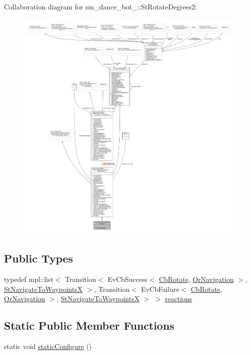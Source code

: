 Collaboration diagram for sm\+\_\+dance\+\_\+bot\+\_\+:\+:St\+Rotate\+Degrees2\+:
\nopagebreak
\begin{figure}[H]
\begin{center}
\leavevmode
\includegraphics[width=350pt]{structsm__dance__bot__2_1_1StRotateDegrees2__coll__graph}
\end{center}
\end{figure}
\subsection*{Public Types}
\begin{DoxyCompactItemize}
\item 
typedef mpl\+::list$<$ Transition$<$ Ev\+Cb\+Success$<$ \hyperlink{classcl__move__base__z_1_1CbRotate}{Cb\+Rotate}, \hyperlink{classsm__dance__bot__2_1_1OrNavigation}{Or\+Navigation} $>$, \hyperlink{structsm__dance__bot__2_1_1StNavigateToWaypointsX}{St\+Navigate\+To\+WaypointsX} $>$, Transition$<$ Ev\+Cb\+Failure$<$ \hyperlink{classcl__move__base__z_1_1CbRotate}{Cb\+Rotate}, \hyperlink{classsm__dance__bot__2_1_1OrNavigation}{Or\+Navigation} $>$, \hyperlink{structsm__dance__bot__2_1_1StNavigateToWaypointsX}{St\+Navigate\+To\+WaypointsX} $>$ $>$ \hyperlink{structsm__dance__bot__2_1_1StRotateDegrees2_a14469da467433ec2e4853efebfadcc8c}{reactions}
\end{DoxyCompactItemize}
\subsection*{Static Public Member Functions}
\begin{DoxyCompactItemize}
\item 
static void \hyperlink{structsm__dance__bot__2_1_1StRotateDegrees2_a9a886efc7aab77c8473eb60a12c2e85c}{static\+Configure} ()
\end{DoxyCompactItemize}

